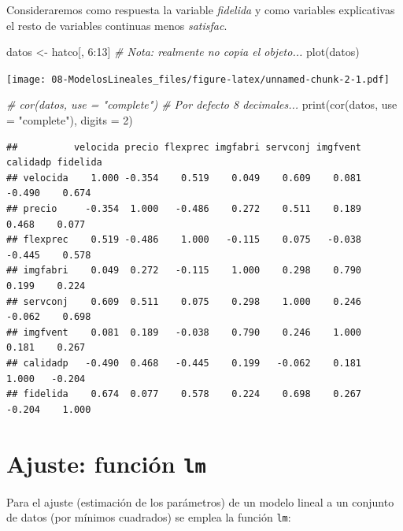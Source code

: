 \documentclass[
]{book}
\newenvironment{Shaded}{\begin{snugshade}}{\end{snugshade}}
\newcommand{\AttributeTok}[1]{\textcolor[rgb]{0.77,0.63,0.00}{#1}}
\newcommand{\CommentTok}[1]{\textcolor[rgb]{0.56,0.35,0.01}{\textit{#1}}}
\newcommand{\DecValTok}[1]{\textcolor[rgb]{0.00,0.00,0.81}{#1}}
\newcommand{\FunctionTok}[1]{\textcolor[rgb]{0.00,0.00,0.00}{#1}}
\newcommand{\NormalTok}[1]{#1}
\newcommand{\OtherTok}[1]{\textcolor[rgb]{0.56,0.35,0.01}{#1}}
\newcommand{\SpecialCharTok}[1]{\textcolor[rgb]{0.00,0.00,0.00}{#1}}
\newcommand{\StringTok}[1]{\textcolor[rgb]{0.31,0.60,0.02}{#1}}
\theoremstyle{break}
\begin{document}
Consideraremos como respuesta la variable \emph{fidelida} y como variables explicativas
el resto de variables continuas menos \emph{satisfac}.

\begin{Shaded}
\begin{Highlighting}[]
\NormalTok{datos }\OtherTok{\textless{}{-}}\NormalTok{ hatco[, }\DecValTok{6}\SpecialCharTok{:}\DecValTok{13}\NormalTok{]  }\CommentTok{\# Nota: realmente no copia el objeto...}
\FunctionTok{plot}\NormalTok{(datos)}
\end{Highlighting}
\end{Shaded}

\texttt{[image: 08-ModelosLineales\_files/figure-latex/unnamed-chunk-2-1.pdf]}

\begin{Shaded}
\begin{Highlighting}[]
\CommentTok{\# cor(datos, use = "complete") \# Por defecto 8 decimales...}
\FunctionTok{print}\NormalTok{(}\FunctionTok{cor}\NormalTok{(datos, }\AttributeTok{use =} \StringTok{"complete"}\NormalTok{), }\AttributeTok{digits =} \DecValTok{2}\NormalTok{)}
\end{Highlighting}
\end{Shaded}

\begin{verbatim}
##          velocida precio flexprec imgfabri servconj imgfvent calidadp fidelida
## velocida    1.000 -0.354    0.519    0.049    0.609    0.081   -0.490    0.674
## precio     -0.354  1.000   -0.486    0.272    0.511    0.189    0.468    0.077
## flexprec    0.519 -0.486    1.000   -0.115    0.075   -0.038   -0.445    0.578
## imgfabri    0.049  0.272   -0.115    1.000    0.298    0.790    0.199    0.224
## servconj    0.609  0.511    0.075    0.298    1.000    0.246   -0.062    0.698
## imgfvent    0.081  0.189   -0.038    0.790    0.246    1.000    0.181    0.267
## calidadp   -0.490  0.468   -0.445    0.199   -0.062    0.181    1.000   -0.204
## fidelida    0.674  0.077    0.578    0.224    0.698    0.267   -0.204    1.000
\end{verbatim}

\hypertarget{ajuste-funciuxf3n-lm}{%
\section{\texorpdfstring{Ajuste: función \texttt{lm}}{Ajuste: función lm}}\label{ajuste-funciuxf3n-lm}}

Para el ajuste (estimación de los parámetros) de un modelo lineal a un conjunto de datos (por mínimos cuadrados) se emplea la función \texttt{lm}:
\end{document}
